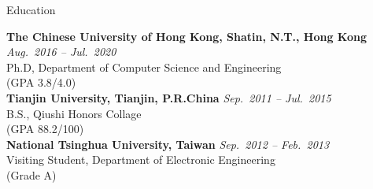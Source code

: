 

\begin{rSection}{Education}


{\bf The Chinese University of Hong Kong, Shatin, N.T., Hong Kong} \hfill {\em Aug.~2016 -- Jul.~2020} \\ 
Ph.D, Department of Computer Science and Engineering \\
(GPA 3.8/4.0)\\
{\bf Tianjin University, Tianjin, P.R.China} \hfill {\em Sep.~2011 -- Jul.~2015} \\ 
B.S., Qiushi Honors Collage \\
(GPA 88.2/100)\\
{\bf National Tsinghua University, Taiwan} \hfill {\em Sep.~2012 -- Feb.~2013} \\ 
Visiting Student, Department of Electronic Engineering \\
(Grade A)


\end{rSection}
